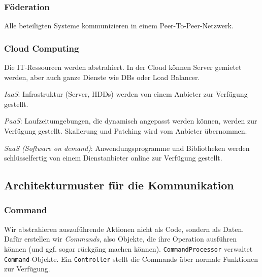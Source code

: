 \documentclass{panikzettel}
\begin{document}
\subsubsection{Föderation}
Alle beteiligten Systeme kommunizieren in einem Peer-To-Peer-Netzwerk.

\subsubsection{Cloud Computing}
Die IT-Ressourcen werden abstrahiert.
In der Cloud können Server gemietet werden, aber auch ganze Dienste wie DBs oder Load Balancer.

\emph{IaaS}: Infrastruktur (Server, HDDs) werden von einem Anbieter zur Verfügung gestellt.

\emph{PaaS}: Laufzeitumgebungen, die dynamisch angepasst werden können, werden zur Verfügung gestellt.
Skalierung und Patching wird vom Anbieter übernommen.

\emph{SaaS (Software on demand)}: Anwendungsprogramme und Bibliotheken werden
schlüsselfertig von einem Dienstanbieter online zur Verfügung gestellt.

\subsection{Architekturmuster für die Kommunikation}

\subsubsection{Command}

Wir abstrahieren auszuführende Aktionen nicht als Code, sondern als Daten. Dafür erstellen wir \emph{Commands}, also Objekte, die ihre Operation ausführen können (und ggf. sogar rückgäng machen können). \lstinline{CommandProcessor} verwaltet \lstinline{Command}-Objekte. Ein \lstinline{Controller} stellt die Commands über normale Funktionen zur Verfügung.

\end{document}
